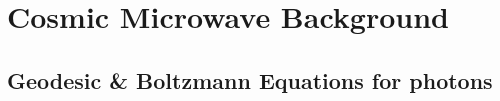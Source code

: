 \chapter{Cosmic Microwave Background}\label{ch:cmb}



\section{Geodesic \& Boltzmann Equations for photons}

